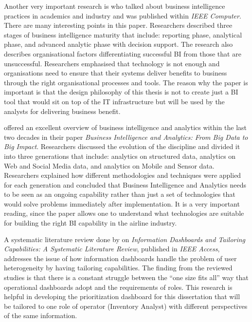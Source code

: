 Another very important research is \citet{WatsonWixom2007} who talked about business intelligence practices in academics and industry and was published within \textit{IEEE Computer}. There are many interesting points in this paper. Researchers described three stages of business intelligence maturity that include: reporting phase, analytical phase, and advanced analytic phase with decision support. The research also describes organisational factors differentiating successful BI from those that are unsuccessful. Researchers emphasised that technology is not enough and organisations need to ensure that their systems deliver benefits to business through the right organisational processes and tools. The reason why the paper is important is that the design philosophy of this thesis is not to create just a BI tool that would sit on top of the IT infrastructure but will be used by the analysts for delivering business benefit.

\citet{ChenChiangStorey2012} offered an excellent overview of business intelligence and analytics within the last two decades in their paper \emph{Business Intelligence and Analytics: From Big Data to Big Impact}. Researchers discussed the evolution of the discipline and divided it into three generations that include: analytics on structured data, analytics on Web and Social Media data, and analytics on Mobile and Sensor data. Researchers explained how different methodologies and techniques were applied for each generation and concluded that Business Intelligence and Analytics needs to be seen as an ongoing capability rather than just a set of technologies that would solve problems immediately after implementation. It is a very important reading, since the paper allows one to understand what technologies are suitable for building the right BI capability in the airline industry.

A systematic literature review done by \citet{VazquezIngelmo2019} on \emph{Information Dashboards and Tailoring Capabilities: A Systematic Literature Review}, published in \textit{IEEE Access}, addresses the issue of how information dashboards handle the problem of user heterogeneity by having tailoring capabilities. The finding from the reviewed studies is that there is a constant struggle between the ``one size fits all'' way that operational dashboards adopt and the requirements of roles. This research is helpful in developing the prioritization dashboard for this dissertation that will be tailored to one role of operator (Inventory Analyst) with different perspectives of the same information.

